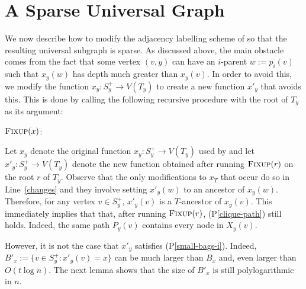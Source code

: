 \documentclass{article}
\newcommand{\pref}[1]{(P\ref{#1})}
\begin{document}
\section{A Sparse Universal Graph}

We now describe how to modify the adjacency labelling scheme of \citet{dujmovic.esperet.ea:adjacency} so that the resulting universal subgraph is sparse.  As discussed above, the main obstacle comes from the fact that some vertex $(v,y)$ can have an $i$-parent $w:=p_i(v)$ such that $x_y(w)$ has depth much greater than $x_y(v)$.  In order to avoid this, we modify the function $x_y:S^+_y\to V(T_y)$ to create a new function $x'_y$ that avoids this. This is done by calling the following recursive procedure with the root of $T_y$ as its argument:

\noindent
\begin{minipage}{\textwidth}
    $\textsc{Fixup}(x)$:
    \begin{algorithmic}[1]
                \ENDIF
            \ENDFOR
        \ENDFOR
    \end{algorithmic}
\end{minipage}

Let $x_y$ denote the original function $x_y:S^+_y\to V(T_y)$ used by \citet{dujmovic.esperet.ea:adjacency} and let $x'_y:S^+_y\to V(T_y)$ denote the new function obtained after running $\textsc{Fixup}(r)$ on the root $r$ of $T_y$.  Observe that the only modifications to $x_T$ that occur do so in Line~\ref{changes} and they involve setting $x'_y(w)$ to an ancestor of $x_y(w)$.  Therefore, for any vertex $v\in S^+_y$, $x'_y(v)$ is a $T$-ancestor of $x_y(v)$.  This immediately implies that that, after running $\textsc{Fixup}(r)$, \pref{clique-path} still holds. Indeed, the same path $P_y(v)$ contains every node in $X_y(v)$.

However, it is not the case that $x'_y$ satisfies \pref{small-bags-i}.  Indeed, $B'_x:=\{v\in S^+_y: x'_y(v)=x\}$ can be much larger than $B_x$ and, even larger than $O(t\log n)$.  The next lemma shows that the size of $B'_x$ is still polylogarithmic in $n$.
\end{document}
